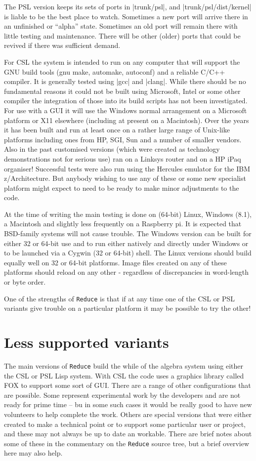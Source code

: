 \documentclass[12pt,twoside,openright]{memoir}
\newcommand{\reduce}{\texttt{Reduce}\xspace}
\begin{document}
The PSL version keeps its sets of ports in |trunk/psl|, and
|trunk/psl/dist/kernel| is liable to be the best place to
watch. Sometimes a new port will arrive there in an unfinished or ``alpha''
state. Sometimes an old port will remain there with little testing and
maintenance. There will be other (older) ports that could be revived if there
was sufficient demand.

For CSL the system is intended to run on any computer that will support the GNU
build tools (gnu make, automake, autoconf) and a reliable C/C++ compiler. It is
generally tested using |gcc| and |clang|. While there should be no fundamental
reasons it could not be built using Microsoft, Intel or some other compiler the
integration of those into its build scripts has not been investigated. For use
with a GUI it will use the Windows normal arrangement on a Microsoft platform
or X11 elsewhere (including at present on a Macintosh). Over the years it has
been built and run at least once on a rather large range of Unix-like platforms
including ones from HP, SGI, Sun and a number of smaller vendors. Also in the
past customised versions (which were created as technology demonstrations not
for serious use) ran on a Linksys router and on a HP iPaq organiser! Successful
tests were also run using the Hercules emulator for the IBM z/Architecture. But
anybody wishing to use any of these or some new specialist platform might
expect to need to be ready to make minor adjustments to the code.

At the time of writing the main testing is done on (64-bit) Linux, Windows
(8.1), a Macintosh and slightly less frequently on a Raspberry pi. It is
expected that BSD-family systems will not cause trouble. The Windows version
can be built for either 32 or 64-bit use and to run either natively and
directly under Windows or to be launched via a Cygwin (32 or 64-bit) shell. The
Linux versions should build equally well on 32 or 64-bit platforms. Image files
created on any of these platforms should reload on any other - regardless of
discrepancies in word-length or byte order.

One of the strengths of \reduce is that if at any time one of the CSL or PSL
variants give trouble on a particular platform it may be possible to try the
other!


\section{Less supported variants}

The main versions of \reduce build the while of the algebra system using either
the CSL or PSL Lisp system. With CSL the code uses a graphics library called
FOX to support some sort of GUI. There are a range of other configurations that
are possible. Some represent experimental work by the developers and are not
ready for prime time -- bu in some such cases it would be really good to have
new volunteers to help complete the work. Others are special versions that
were either created to make a technical point or to support some particular
user or project, and these may not always be up to date an workable. There
are brief notes about some of these in the commentary on the \reduce
source tree, but a brief overview here may also help.
\end{document}
